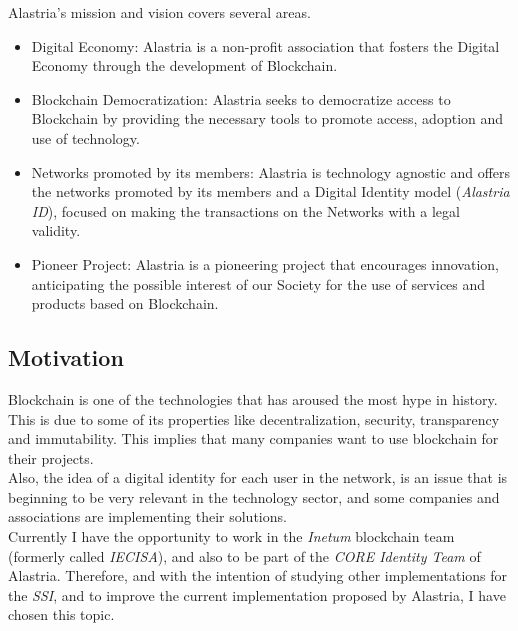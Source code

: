 \documentclass[a4paper, 12pt]{article} %
\begin{document}
        Alastria's mission and vision covers several areas.
        \begin{itemize}
            \item Digital Economy: Alastria is a non-profit association that fosters the Digital Economy through the development of Blockchain.
            \item Blockchain Democratization: Alastria seeks to democratize access to Blockchain by providing the necessary tools to promote access, adoption and use of technology.
            \item Networks promoted by its members: Alastria is technology agnostic and offers the networks promoted by its members and a Digital Identity model (\textit{Alastria ID}), focused on making the transactions on the Networks with a legal validity. 
            \item Pioneer Project: Alastria is a pioneering project that encourages innovation, anticipating the possible interest of our Society for the use of services and products based on Blockchain.
        \end{itemize}
        
        \subsection{Motivation}
            Blockchain is one of the technologies that has aroused the most hype in history. This is due to some of its properties like decentralization, security, transparency and immutability. This implies that many companies want to use blockchain for their projects.\\
            
            Also, the idea of a digital identity for each user in the network, is an issue that is beginning to be very relevant in the technology sector, and some companies and associations are implementing their solutions.\\
            
            
            Currently I have the opportunity to work in the \textit{Inetum} blockchain team (formerly called \textit{IECISA}), and also to be part of the \textit{CORE Identity Team} of Alastria. Therefore, and with the intention of studying other implementations for the \textit{SSI}, and to improve the current implementation proposed by Alastria, I have chosen this topic.
            
\end{document}
